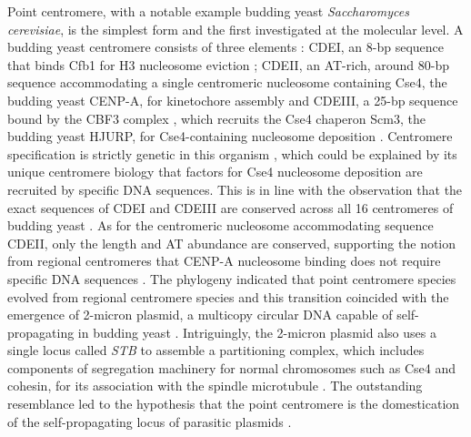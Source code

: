 Point centromere, with a notable example budding yeast \textit{Saccharomyces cerevisiae}, is the simplest form and the first investigated at the molecular level. A budding yeast centromere consists of three elements \citep{Carbon1984StructuralCEN3}: CDEI, an 8-bp sequence that binds Cfb1 for H3 nucleosome eviction \citep{Niedenthal1993Cpf1I, Henikoff2011EpigenomeResolution}; CDEII, an AT-rich, around 80-bp sequence accommodating a single centromeric nucleosome containing Cse4, the budding yeast CENP-A, for kinetochore assembly \citep{Furuyama2007CentromereYeast, Henikoff2014TheVivo, Krassovsky2012TripartiteYeast} and CDEIII, a 25-bp sequence bound by the CBF3 complex \citep{Yan2018ArchitectureKinetochore}, which recruits the Cse4 chaperon Scm3, the budding yeast HJURP, for Cse4-containing nucleosome deposition \citep{Stoler2007Scm3Localization, Camahort2007Scm3Kinetochore}. Centromere specification is strictly genetic in this organism \citep{Clarke1980IsolationChromosomes, J1986SingleCerevisiae, Kingsbury1991Centromere-dependentVitro}, which could be explained by its unique centromere biology that factors for Cse4 nucleosome deposition are recruited by specific DNA sequences. This is in line with the observation that the exact sequences of CDEI and CDEIII are conserved across all 16 centromeres of budding yeast \citep{Clarke1998Centromeres:Eukaryotes, Baker2005GeneticCerevisiae}. As for the centromeric nucleosome accommodating sequence CDEII, only the length and AT abundance are conserved, supporting the notion from regional centromeres that CENP-A nucleosome binding does not require specific DNA sequences \citep{Bensasson2011EvidenceCentromeres}. The phylogeny indicated that point centromere species evolved from regional centromere species and this transition coincided with the emergence of 2-micron plasmid, a multicopy circular DNA capable of self-propagating in budding yeast \citep{Malik2009MajorComplexity}. Intriguingly, the 2-micron plasmid also uses a single locus called \textit{STB} to assemble a partitioning complex, which includes components of segregation machinery for normal chromosomes such as Cse4 and cohesin, for its association with the spindle microtubule \citep{Rizvi2018TheCerevisiae, Huang2011Evolution, Ghosh2007FaithfulSisters}. The outstanding resemblance led to the hypothesis that the point centromere is the domestication of the self-propagating locus of parasitic plasmids \citep{Malik2009MajorComplexity}. 

